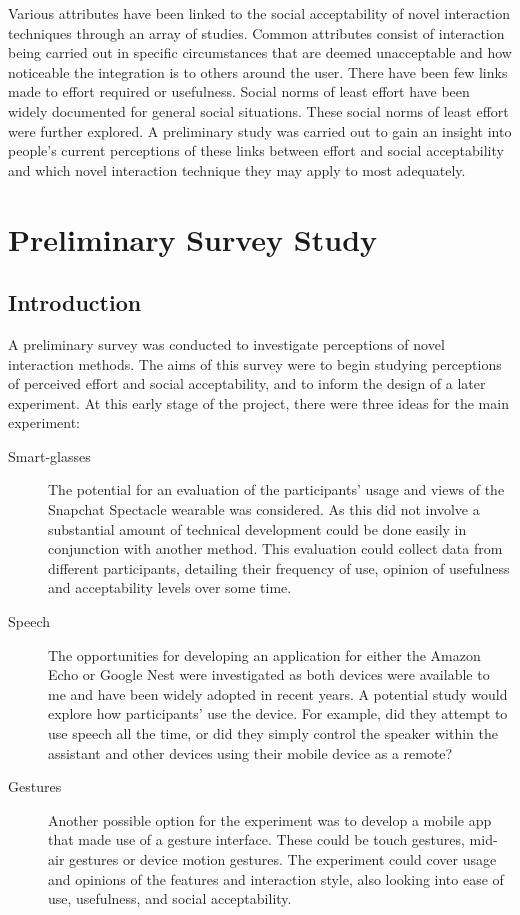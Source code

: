 \documentclass{l4proj}
\begin{document}
Various attributes have been linked to the social acceptability of novel interaction techniques through an array of studies. Common attributes consist of interaction being carried out in specific circumstances that are deemed unacceptable and how noticeable the integration is to others around the user. There have been few links made to effort required or usefulness. Social norms of least effort have been widely documented for general social situations. These social norms of least effort were further explored. A preliminary study was carried out to gain an insight into people's current perceptions of these links between effort and social acceptability and which novel interaction technique they may apply to most adequately.

\chapter{Preliminary Survey Study}

\section{Introduction}

A preliminary survey was conducted to investigate perceptions of novel interaction methods. The aims of this survey were to begin studying perceptions of perceived effort and social acceptability, and to inform the design of a later experiment. At this early stage of the project, there were three ideas for the main experiment:

\begin{description}
    \item[Smart-glasses] The potential for an evaluation of the participants' usage and views of the Snapchat Spectacle wearable was considered. As this did not involve a substantial amount of technical development could be done easily in conjunction with another method. This evaluation could collect data from different participants, detailing their frequency of use, opinion of usefulness and acceptability levels over some time.  

    \item[Speech] The opportunities for developing an application for either the Amazon Echo or Google Nest were investigated as both devices were available to me and have been widely adopted in recent years. A potential study would explore how participants' use the device. For example, did they attempt to use speech all the time, or did they simply control the speaker within the assistant and other devices using their mobile device as a remote? 

    \item[Gestures] Another possible option for the experiment was to develop a mobile app that made use of a gesture interface. These could be touch gestures, mid-air gestures or device motion gestures. The experiment could cover usage and opinions of the features and interaction style, also looking into ease of use, usefulness, and social acceptability.
\end{description}
\end{document}
